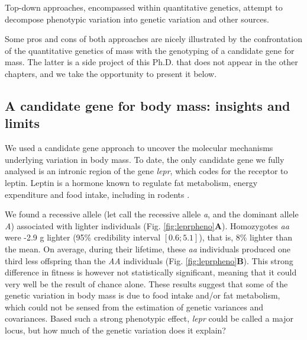 Top-down approaches, encompassed within quantitative genetics, attempt to decompose phenotypic variation into genetic variation and other sources. 

Some pros and cons of both approaches are nicely illustrated by the confrontation of the quantitative genetics of mass with the genotyping of a candidate gene for mass. The latter is a side project of this Ph.D. that does not appear in the other chapters, and we take the opportunity to present it below.

\subsection{A candidate gene for body mass: insights and limits}

We used a candidate gene approach \parencite{Fitzpatrick2005} to uncover the molecular mechanisms underlying variation in body mass. To date, the only candidate gene we fully analysed is an intronic region of the gene \emph{lepr}, which codes for the receptor to leptin. Leptin is a hormone known to regulate fat metabolism, energy expenditure and food intake, including in rodents \parencite{Houseknecht1998}.

We found a recessive allele (let call the recessive allele \emph{a}, and the dominant allele \emph{A}) associated with lighter individuals (Fig. \ref{fig:leprpheno}\textbf{A}). Homozygotes \emph{aa} were -2.9 g lighter (95\% credibility interval $[0.6;5.1]$), that is, 8\% lighter than the mean. On average, during their lifetime, these \emph{aa} individuals produced one third less offspring than the \emph{AA} individuals (Fig. \ref{fig:leprpheno}\textbf{B}). This strong difference in fitness is however not statistically significant, meaning that it could very well be the result of chance alone. These results suggest that some of the genetic variation in body mass is due to food intake and/or fat metabolism, which could not be sensed from the estimation of genetic variances and covariances. 
Based such a strong phenotypic effect, \emph{lepr} could be called a major locus, but how much of the genetic variation does it explain?

